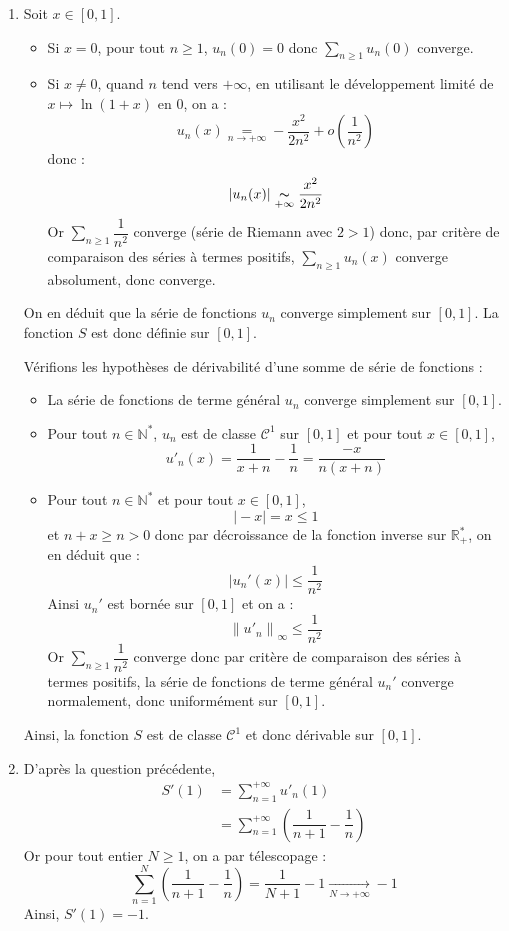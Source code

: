 \documentclass[a4paper,10pt]{report}
\newcommand{\Sum}[2]{\ensuremath{\textstyle{\sum\limits_{#1}^{#2}}}}
\begin{document}
\begin{enumerate}
\item Soit $x \in \left[ {0,1} \right]$.
\begin{itemize}
\item Si $x=0$, pour tout $n \geq 1$, $u_n(0)=0$ donc $\Sum{n\geq 1}{} u_n(0)$ converge.
\item Si $x\neq 0$, quand $n$ tend vers $ + \infty $, en utilisant le développement limité de $x \mapsto \ln(1+x)$ en $0$, on a :
$$u_n (x) \underset{n \rightarrow + \infty}{=}  - \dfrac{{x^2 }}{2{n^2 }} + o\left( {\dfrac{1}{{n^2 }}} \right)$$
donc :
$$|u_n(x)|\underset{+\infty}{\thicksim}\dfrac{x^2 }{2n^2 }$$
Or  $\Sum{n\geq 1}{} \dfrac{1}{n^2}$ converge (série de Riemann avec $2>1$) donc, par critère de comparaison des séries à termes positifs, $\Sum{n\geq 1}{} u_n(x)$ converge absolument, donc converge.
\end{itemize}
On en déduit que la série de fonctions $u_n $ converge simplement sur $\left[ {0,1} \right]$. La fonction $S$ est donc définie sur $\left[ {0,1} \right]$.

\bigskip

\noindent Vérifions les hypothèses de dérivabilité d'une somme de série de fonctions :
\begin{itemize}
\item La série de fonctions de terme général $u_n$ converge simplement sur $[0,1]$.
\item Pour tout $n \in \mathbb{N}^*$, $u_n $ est de  classe $\mathcal{C}^1 $ sur $\left[ {0,1} \right]$ et pour tout $x \in [0,1]$,
$$u'_n (x) = \dfrac{1}{{x + n}} - \dfrac{1}{n} = \dfrac{{ - x}}{{n(x + n)}}$$
\item Pour tout $n\in\mathbb{N}^*$ et pour tout $x\in\left[ {0,1} \right]$,
$$\vert -x \vert = x \leq 1$$
et $n+x \geq n>0$ donc par décroissance de la fonction inverse sur $\mathbb{R}_+^*$, on en déduit que :
$$|u_n'(x)|\leq \dfrac{1}{n^2}$$
Ainsi $u_n'$ est bornée sur $[0,1]$ et on a :
$$\left\| {u'_n } \right\|_\infty   \leq \dfrac{1}{{n^2 }}$$
Or $\Sum{n\geq 1}{} \dfrac{1}{n^2}$ converge donc par critère de comparaison des séries à termes positifs, la série de fonctions de terme général $u_n'$ converge normalement, donc uniformément sur $\left[ {0,1} \right]$.
\end{itemize}
Ainsi, la fonction $S$ est de classe $\mathcal{C}^1$ et donc dérivable sur $[0,1]$. 
\item D'après la question précédente,
\begin{align*}
S'(1) & = \displaystyle\sum\limits_{n = 1}^{ + \infty } {u'_n (1)} \\
&   =\displaystyle\sum\limits_{n = 1}^{ + \infty } {\left( {\dfrac{1}{{n + 1}} - \dfrac{1}{n}} \right)} 
\end{align*}
Or pour tout entier $N \geq 1$, on a par télescopage :
$$\displaystyle\sum\limits_{n = 1}^N {\left( {\dfrac{1}{{n + 1}} - \dfrac{1}{n}} \right)}  = \dfrac{1}{{N + 1}} - 1\xrightarrow[{N \to  + \infty }]{} -1$$
Ainsi, $S'(1) =-1$.
\end{enumerate}
\end{document}

